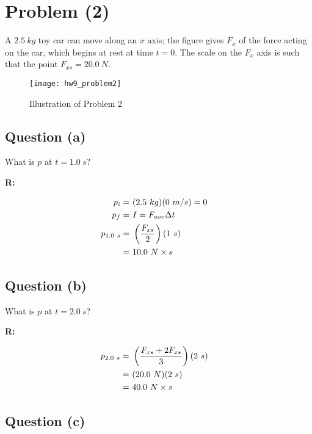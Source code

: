 \section{Problem (2)}

	A $2.5 \ kg$ toy car can move along an $x$ axis; the figure gives $F_{x}$ of the force acting on the car, which begins at rest at time $t = 0$. The scale on the $F_{x}$ axis is such that the point $F_{xs} = 20.0 \ N$.

	\begin{figure}[H]
		\begin{center}
			\texttt{[image: hw9\_problem2]}
			\caption{Illustration of Problem 2}
			\label{fig:hw9_problem2}
		\end{center}
	\end{figure}

	\subsection{Question (a)}

		What is $p$ at $t = 1.0 \ s$?

		\textbf{R:}

		\begin{align}
			p_{i} = \ &(2.5 \ kg)(0 \ m/s) = 0& \notag \\
			p_{f} = \ &I = F_{ave}\Delta t& \notag \\
			p_{1.0 \ s} = \ &\left(\frac{F_{xs}}{2}\right)(1 \ s)& \notag \\
			 = \ &10.0 \ N \times s&
		\end{align}

	\subsection{Question (b)}

		What is $p$ at $t = 2.0 \ s$?

		\textbf{R:}

		\begin{align}
			p_{2.0 \ s} = \ &\left(\frac{F_{xs} + 2F_{xs}}{3}\right)(2 \ s)& \notag \\
			= \ &(20.0 \ N)(2 \ s)& \notag \\
			= \ &40.0 \ N \times s&
		\end{align}

	\subsection{Question (c)}

